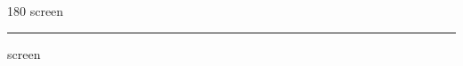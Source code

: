 
\begin{frame}
\begin{center}
\begin{turn}{180}
{\fontsize{2.5cm}{1em}\selectfont screen}
\end{turn}
\vspace{1em}\par  
\hrule
\vspace{1em}\par  
{\fontsize{2.5cm}{1em}\selectfont screen}
\end{center}
\end{frame}

